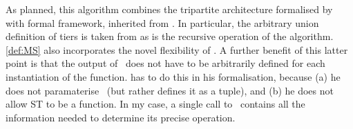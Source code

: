 As planned, this algorithm combines the tripartite architecture formalised by \textcite{KeH_2019} with  formal framework, inherited from \CS. In particular, the arbitrary union definition of tiers is taken from \textcite[16]{MilwayD_2021} as is the recursive operation of the algorithm. \autoref{def:MS} also incorporates the novel flexibility of \ST. A further benefit of this latter point is that the output of \MS\ does not have to be arbitrarily defined for each instantiation of the function. \textcite{KeH_2019} has to do this in his formalisation, because (a) he does not paramaterise \MS\ (but rather defines it as a tuple), and (b) he does not allow ST to be a function. In my case, a single call to \MS\ contains all the information needed to determine its precise operation.

